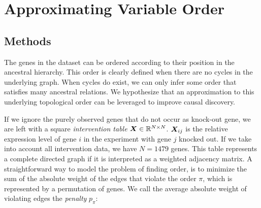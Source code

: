 \newpage
\section{Approximating Variable Order}








\subsection{Methods}


The genes in the dataset can be ordered according to their position in the ancestral hierarchy. This order is clearly defined when there are no cycles in the underlying graph. When cycles do exist, we can only infer some order that satisfies many ancestral relations. We hypothesize that an approximation to this underlying topological order can be leveraged to improve causal discovery.

If we ignore the purely observed genes that do not occur as knock-out gene, we are left with a square \textit{intervention table} $\bm{X} \in \mathbb{R}^{N\times N}$. $\bm{X}_{ij}$ is the relative expression level of gene $i$ in the experiment with gene $j$ knocked out. If we take into account all intervention data, we have $N=1479$ genes. This table represents a complete directed graph if it is interpreted as a weighted adjacency matrix. A straightforward way to model the problem of finding order, is to minimize the sum of the absolute weight of the edges that violate the order $\pi$, which is represented by a permutation of genes. We call the average absolute weight of violating edges the \textit{penalty} $p_\pi$:

